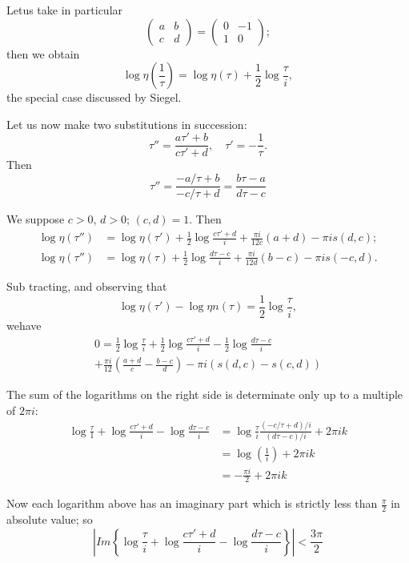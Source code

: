 Let\pageoriginale us take in particular
$$
\begin{pmatrix}
  a & b\\
  c & d
\end{pmatrix}= 
\begin{pmatrix}
  0 & -1\\
  1 & 0
\end{pmatrix};
$$
then we obtain 
$$
\log \eta \left( \frac{1}{\tau}\right)= \log \eta (\tau) + \frac{1}{2}
\log \frac{\tau}{i},
$$
the special case discussed by Siegel.

Let us now make two substitutions in succession: 
$$
\tau'' = \frac{a \tau'+b}{c \tau' +d}, \quad \tau' =- \frac{1}{\tau}.
$$
Then
$$
\tau'' = \frac{-a/\tau +b}{-c/\tau+d} = \frac{b \tau -a}{d \tau -c}
$$

We suppose $c> 0$, $d> 0$; $(c, d)=1$. Then
\begin{align*}
  \log \eta(\tau'')& = \log \eta (\tau') + \frac{1}{2} \log \frac{c
    \tau'+d}{i} + \frac{\pi i}{12c} (a+d)- \pi i s(d,c);\\
  \log \eta (\tau'') & = \log \eta (\tau) + \frac{1}{2} \log \frac{d
    \tau -c}{i} + \frac{\pi i}{12d} (b-c) - \pi i s(-c, d).
\end{align*}

Sub tracting, and observing that 
$$
\log \eta (\tau') - \log \eta n (\tau) = \frac{1}{2} \log \frac{\tau}{i},
$$
we\pageoriginale have
\begin{multline*}
  0 = \frac{1}{2} \log \frac{\tau}{i} + \frac{1}{2} \log \frac{c \tau'
    +d}{i} - \frac{1}{2} \log \frac{d \tau -c}{i}\\ 
  + \frac{\pi i}{12}
  \left( \frac{a+d}{c}- \frac{b-c}{d}\right) - \pi i (s (d,c)- s(c, d))
\end{multline*}

The sum of the logarithms on the right side is determinate only up to
a multiple of $2 \pi i$:
\begin{align*}
  \log \frac{\tau}{1} + \log \frac{c \tau' +d}{i} - \log \frac{d
    \tau-c}{i} & = \log \frac{\tau}{i} \frac{(- c/\tau + d)/i}{(d \tau
    -c)/i} + 2 \pi i k\\
  & = \log \left( \frac{1}{i}\right) +2 \pi i k\\
  & = - \frac{\pi i}{2} + 2 \pi i k
\end{align*}

Now each logarithm above has an imaginary part which is strictly less
than $\frac{\pi}{2}$ in absolute value; so
$$
\left| Im \left\{ \log \frac{\tau}{i} + \log \frac{c
  \tau'+d}{i} - \log \frac{d \tau-c}{i}\right\}\right| < \frac{3 \pi}{2}
$$

